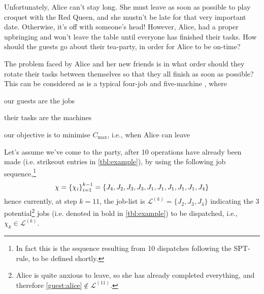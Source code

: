 Unfortunately, Alice can't stay long. She must leave as soon as possible to 
play croquet with the Red Queen, 
and she mustn't be late for that very important date. Otherwise, it's off with 
someone's head! However, Alice, had a proper upbringing and won't leave the 
table until everyone has finished their tasks. 
How should the guests go about their tea-party, in order for Alice to be 
on-time?

The problem faced by Alice and her new friends is in what order should they 
rotate their tasks between themselves so that they all finish as soon as 
possible? This can be considered as is a typical four-job and five-machine 
\jsp, where
\begin{enumerate*}[label={{}}]
    \item our guests are the jobs
    \item their tasks are the machines
    \item our objective is to minimise $C_{\max}$, i.e., when Alice can 
    leave
\end{enumerate*}

Let's assume we've come to the party, after 10 operations have already been 
made (i.e. strikeout entries in \cref{tbl:example}), by using the following 
job sequence,\footnote{In fact this is the sequence resulting from 10 
    dispatches following the SPT-rule, to be defined shortly.}
\begin{equation}
\vchi = \left\{ \chi_i \right\}_{i=1}^{k-1} \label{eq:vchi:example}
= \left\{ J_4,J_2,J_3,J_3,J_1,J_1,J_1,J_1,J_1,J_4 \right\}
\end{equation}
hence currently, at step $k=11$, the job-list is 
$\mathcal{L}^{(k)}=\{J_2,J_3,J_4\}$ indicating the 3 potential\footnote{
    Alice is quite anxious to leave, so she has already completed everything, 
    and therefore \ref{guest:alice}$\notin\mathcal{L}^{(11)}$.} 
jobs (i.e. denoted in bold in \cref{tbl:example}) to be dispatched, i.e., 
$\chi_k\in\mathcal{L}^{(k)}$.



